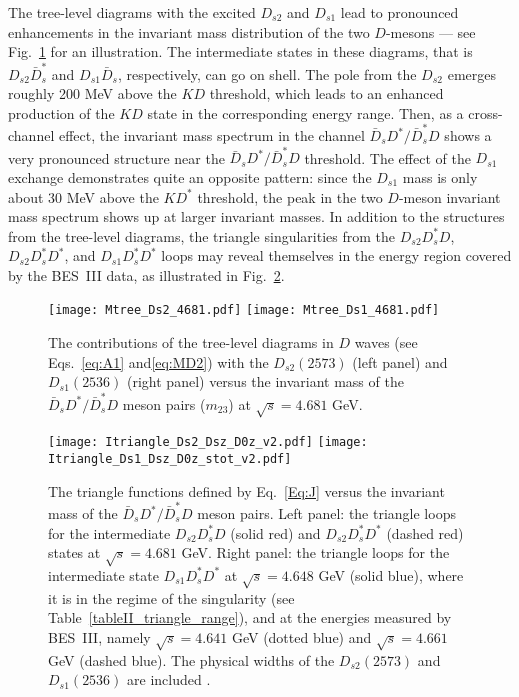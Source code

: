 \documentclass[preprint,12pt,3p]{elsarticle}
\begin{document}
The tree-level diagrams with the excited $D_{s2}$ and $D_{s1}$ lead to pronounced enhancements in the invariant mass distribution of the two $D$-mesons --- see Fig.~\ref{fig:tree} for an illustration. The intermediate states in these diagrams, that is $D_{s2} \bar{D}_s^*$ and $D_{s1} \bar{D}_s$, respectively, can go on shell. The pole from the $D_{s2}$ emerges roughly 200 MeV above
the $KD$ threshold, which leads to an enhanced production of the $KD$ state in the corresponding energy range. Then, as a cross-channel effect, the invariant mass spectrum in the channel $\bar{D}_s D^*/ \bar{D}_s^* D$ shows a very pronounced structure near the $\bar{D}_s D^*/ \bar{D}_s^* D$ threshold. The effect of the $D_{s1}$ exchange demonstrates quite an opposite pattern: since the $D_{s1}$ mass is only about 30 MeV above the $KD^*$ threshold, the peak in the two $D$-meson invariant mass spectrum shows up at larger invariant masses. In addition to the structures from the tree-level diagrams, the triangle singularities from the $D_{s2} D_s^* D$, $D_{s2} D_s^* D^*$, and $D_{s1} D_s^* D^*$ loops may reveal themselves in the energy region covered by the BES~III data, as illustrated in Fig.~\ref{fig:triangles}. 

\begin{figure}[t]
\centering
\texttt{[image: Mtree\_Ds2\_4681.pdf]}
\texttt{[image: Mtree\_Ds1\_4681.pdf]}
\caption{The contributions of the tree-level diagrams in $D$ waves (see Eqs.~\eqref{eq:A1} and\eqref{eq:MD2}) with the $D_{s2}(2573)$ (left panel) and $D_{s1}(2536)$ (right panel)  
versus the invariant mass of the $\bar{D}_s D^*/ \bar{D}_s^* D$ meson pairs ($m_{23}$) at $\sqrt{s}=4.681$ GeV.}
\label{fig:tree}
\end{figure}

\begin{figure}[t]
\centering
\texttt{[image: Itriangle\_Ds2\_Dsz\_D0z\_v2.pdf]}
\texttt{[image: Itriangle\_Ds1\_Dsz\_D0z\_stot\_v2.pdf]}
\caption{ The triangle functions defined by Eq.~\eqref{Eq:J} versus the invariant mass of the $\bar{D}_s D^*/ \bar{D}_s^*D$ meson pairs. 
Left panel: the triangle loops for the intermediate $D_{s2}D_s^*D$ (solid red) and $D_{s2}D_s^*D^*$ (dashed red) states at $\sqrt{s}=4.681$ GeV. Right panel: the triangle loops for the intermediate state $D_{s1}D_s^* D^*$ at $\sqrt{s}=4.648$ GeV (solid blue), where it is in the regime of the singularity (see Table~\ref{tableII_triangle_range}), and at the energies measured by BES~III, namely $\sqrt{s}=4.641$ GeV (dotted blue) and $\sqrt{s}=4.661$ GeV (dashed blue). The physical widths of the $D_{s2}(2573)$ and $D_{s1}(2536)$ are included \cite{Zyla:2020zbs}.}
\label{fig:triangles}
\end{figure}
\end{document}

